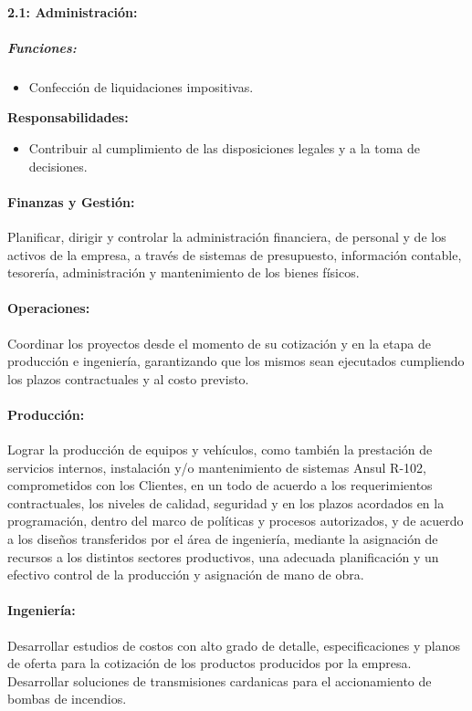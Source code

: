 \documentclass[a4paper,10pt]{article}
\begin{document}
	\paragraph{2.1: Administración:}
	\subparagraph{Funciones:}
	\begin{itemize}
		\item Confección de liquidaciones impositivas.
	\end{itemize}

	\textbf{Responsabilidades:}
	\begin{itemize}
		\item Contribuir al cumplimiento de las disposiciones legales y a la toma de decisiones.
	\end{itemize}
	
	\paragraph{Finanzas y Gestión:}
			Planificar, dirigir y controlar la administración financiera, de personal y de los activos de la empresa, a través de sistemas de presupuesto, información contable, tesorería, administración y mantenimiento de los bienes físicos.
	\paragraph{Operaciones:}
			Coordinar los proyectos desde el momento de su cotización y en la etapa de producción e ingeniería,
garantizando que los mismos sean ejecutados cumpliendo los plazos contractuales y al costo previsto.
	\paragraph{Producción:}
			Lograr la producción de equipos y vehículos, como también la prestación de servicios
internos, instalación y/o mantenimiento de sistemas Ansul R-102, comprometidos con los
Clientes, en un todo de acuerdo a los requerimientos contractuales, los niveles de calidad,
seguridad y en los plazos acordados en la programación, dentro del marco de políticas y
procesos autorizados, y de acuerdo a los diseños transferidos por el área de ingeniería,
mediante la asignación de recursos a los distintos sectores productivos, una adecuada
planificación y un efectivo control de la producción y asignación de mano de obra.
\paragraph{Ingeniería:}
			Desarrollar estudios de costos con alto grado de detalle, especificaciones y planos de
oferta para la cotización de los productos producidos por la empresa.
Desarrollar soluciones de transmisiones cardanicas para el accionamiento de
bombas de incendios.
\newpage
\end{document}
